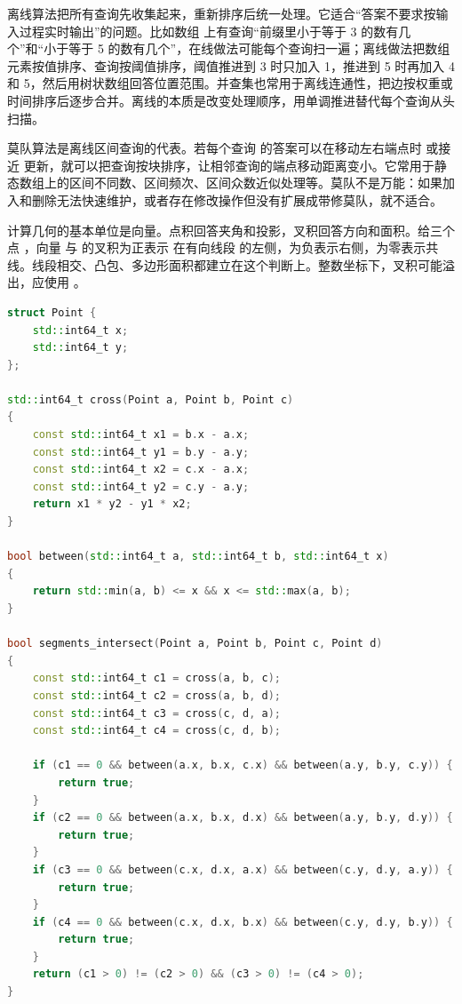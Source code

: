 离线算法把所有查询先收集起来，重新排序后统一处理。它适合“答案不要求按输入过程实时输出”的问题。比如数组 \code{[5,1,4]} 上有查询“前缀里小于等于 3 的数有几个”和“小于等于 5 的数有几个”，在线做法可能每个查询扫一遍；离线做法把数组元素按值排序、查询按阈值排序，阈值推进到 3 时只加入 1，推进到 5 时再加入 4 和 5，然后用树状数组回答位置范围。并查集也常用于离线连通性，把边按权重或时间排序后逐步合并。离线的本质是改变处理顺序，用单调推进替代每个查询从头扫描。

莫队算法是离线区间查询的代表。若每个查询 \code{[l,r]} 的答案可以在移动左右端点时  或接近  更新，就可以把查询按块排序，让相邻查询的端点移动距离变小。它常用于静态数组上的区间不同数、区间频次、区间众数近似处理等。莫队不是万能：如果加入和删除无法快速维护，或者存在修改操作但没有扩展成带修莫队，就不适合。


计算几何的基本单位是向量。点积回答夹角和投影，叉积回答方向和面积。给三个点 ，向量  与  的叉积为正表示  在有向线段  的左侧，为负表示右侧，为零表示共线。线段相交、凸包、多边形面积都建立在这个判断上。整数坐标下，叉积可能溢出，应使用 。

\begin{lstlisting}[language=C++,caption={几何基础：叉积和线段相交}]
struct Point {
    std::int64_t x;
    std::int64_t y;
};

std::int64_t cross(Point a, Point b, Point c)
{
    const std::int64_t x1 = b.x - a.x;
    const std::int64_t y1 = b.y - a.y;
    const std::int64_t x2 = c.x - a.x;
    const std::int64_t y2 = c.y - a.y;
    return x1 * y2 - y1 * x2;
}

bool between(std::int64_t a, std::int64_t b, std::int64_t x)
{
    return std::min(a, b) <= x && x <= std::max(a, b);
}

bool segments_intersect(Point a, Point b, Point c, Point d)
{
    const std::int64_t c1 = cross(a, b, c);
    const std::int64_t c2 = cross(a, b, d);
    const std::int64_t c3 = cross(c, d, a);
    const std::int64_t c4 = cross(c, d, b);

    if (c1 == 0 && between(a.x, b.x, c.x) && between(a.y, b.y, c.y)) {
        return true;
    }
    if (c2 == 0 && between(a.x, b.x, d.x) && between(a.y, b.y, d.y)) {
        return true;
    }
    if (c3 == 0 && between(c.x, d.x, a.x) && between(c.y, d.y, a.y)) {
        return true;
    }
    if (c4 == 0 && between(c.x, d.x, b.x) && between(c.y, d.y, b.y)) {
        return true;
    }
    return (c1 > 0) != (c2 > 0) && (c3 > 0) != (c4 > 0);
}
\end{lstlisting}

